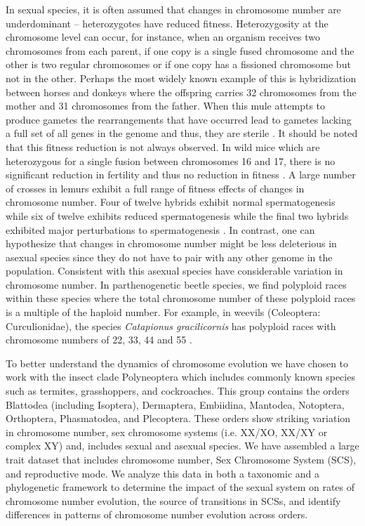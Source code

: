 In sexual species, it is often assumed that changes in chromosome number are underdominant \citep{white1973} -- heterozygotes have reduced fitness. 
Heterozygosity at the chromosome level can occur, for instance, when an organism receives two chromosomes from each parent, if one copy is a single fused chromosome and the other is two regular chromosomes or if one copy has a fissioned chromosome but not in the other.
Perhaps the most widely known example of this is hybridization between horses and donkeys where the offspring carries 32 chromosomes from the mother and 31 chromosomes from the father. 
When this mule attempts to produce gametes the rearrangements that have occurred lead to gametes lacking a full set of all genes in the genome and thus, they are sterile \citep{wodsedalek1916}. 
It should be noted that this fitness reduction is not always observed.
In wild mice which are heterozygous for a single fusion between chromosomes 16 and 17, there is no significant reduction in fertility and thus no reduction in fitness \citep{britton1990robertsonian}.
A large number of crosses in lemurs exhibit a full range of fitness effects of changes in chromosome number.
Four of twelve hybrids exhibit normal spermatogenesis while six of twelve exhibits reduced spermatogenesis while the final two hybrids exhibited major perturbations to spermatogenesis \citep{ratomponirina1988}.   
In contrast, one can hypothesize that changes in chromosome number might be less deleterious in asexual species since they do not have to pair with any other genome in the population.
Consistent with this asexual species have considerable variation in chromosome number.
In parthenogenetic beetle species, we find polyploid races within these species where the total chromosome number of these polyploid races is a multiple of the haploid number.
For example, in weevils (Coleoptera: Curculionidae), the species \textit{Catapionus gracilicornis} has polyploid races with chromosome numbers of 22, 33, 44 and 55 \citep{lachowska1998}. 

To better understand the dynamics of chromosome evolution we have chosen to work with the insect clade Polyneoptera which includes commonly known species such as termites, grasshoppers, and cockroaches.
This group contains the orders Blattodea (including Isoptera), Dermaptera, Embiidina, Mantodea, Notoptera, Orthoptera, Phasmatodea, and Plecoptera.
These orders show striking variation in chromosome number, sex chromosome systems (i.e. XX/XO, XX/XY or complex XY) and, includes sexual and asexual species. 
We have assembled a large trait dataset that includes chromosome number, Sex Chromosome System (SCS), and reproductive mode.
We analyze this data in both a taxonomic and a phylogenetic framework to determine the impact of the sexual system on rates of chromosome number evolution, the source of transitions in SCSs, and identify differences in patterns of chromosome number evolution across orders.